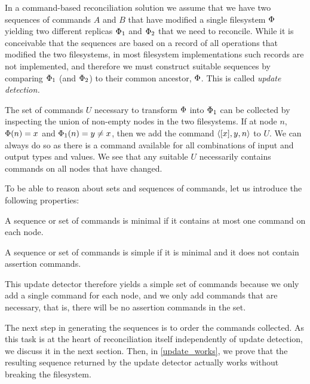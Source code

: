 
In a command-based reconciliation solution we assume that we have two sequences of commands
$A$ and $B$ that have modified a single filesystem $\Phi$ yielding two different replicas $\Phi_1$ and $\Phi_2$ that we
need to reconcile. While it is conceivable that the sequences are based on a record of
all operations that modified the two filesystems, in most filesystem implementations
such records are not implemented, and therefore we must construct suitable sequences
by comparing $\Phi_1$ (and $\Phi_2$) to their common ancestor, $\Phi$. 
This is called \emph{update detection.}

The set of commands $U$ necessary to transform $\Phi$ into $\Phi_1$ can be collected
by inspecting the union of non-empty nodes in the two filesystems.
If at node $n$, $\Phi(n)=x$ and $\Phi_1(n)=y\neq x$, then we add the command $\langle{[x],y,n}\rangle$ to $U$.
We can always do so as there is a command available for all combinations of input and output types and values.
We see that any suitable $U$ necessarily contains commands on all nodes that have changed.


To be able to reason about sets and sequences of commands, let us introduce the following properties:


\begin{mydef}
A sequence or set of commands is minimal if it contains at most one command on each node.
\end{mydef}

\begin{mydef}
A sequence or set of commands is simple if it is minimal and it does not contain assertion commands.
\end{mydef}

This update detector therefore yields a simple set of commands because we only add a single command
for each node, and we only add commands that are necessary, that is, there will be no 
assertion commands in the set.

The next step in generating the sequences is to order the commands collected.
As this task is at the heart of reconciliation itself independently of update detection,
we discuss it in the next section.
Then, in \cref{update_works}, we prove that the resulting sequence 
returned by the update detector actually works without breaking the filesystem.
